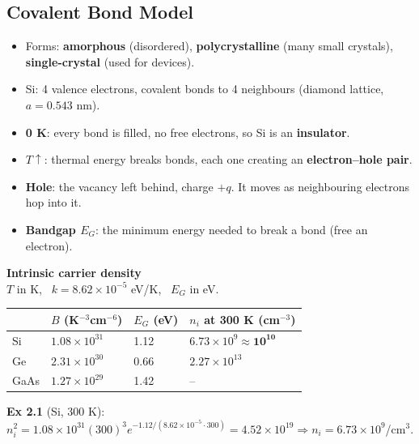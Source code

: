     \subsection[2.2]{Covalent Bond Model}
    \begin{itemize}
        \item Forms: \textbf{amorphous} (disordered), \textbf{polycrystalline} (many small crystals), \textbf{single-crystal} (used for devices).
        \item Si: 4 valence electrons, covalent bonds to 4 neighbours (diamond lattice, $a = 0.543$ nm).
        \item \textbf{0 K}: every bond is filled, no free electrons, so Si is an \textbf{insulator}.
        \item \textbf{$T\uparrow$}: thermal energy breaks bonds, each one creating an \textbf{electron--hole pair}.
        \item \textbf{Hole}: the vacancy left behind, charge $+q$. It moves as neighbouring electrons hop into it.
        \item \textbf{Bandgap $E_G$}: the minimum energy needed to break a bond (free an electron).
    \end{itemize}
    \textbf{Intrinsic carrier density} 
    \\
    $T$ in K, \ $k = 8.62\times10^{-5}$ eV/K, \ $E_G$ in eV.\\
    {\setlength{\tabcolsep}{2.5pt}%
    \begin{tabular}{|l|l|l|l|}
        \hline
        & $B$ (K$^{-3}$cm$^{-6}$) & $E_G$ (eV) & $n_i$ at 300 K (cm$^{-3}$) \\ \hline
        Si & $1.08\times10^{31}$ & 1.12 & $6.73\times10^{9} \approx \mathbf{10^{10}}$ \\ \hline
        Ge & $2.31\times10^{30}$ & 0.66 & $2.27\times10^{13}$ \\ \hline
        GaAs & $1.27\times10^{29}$ & 1.42 & -- \\ \hline
    \end{tabular}\par}\vspace{1pt}
    \textbf{Ex 2.1} (Si, 300 K): $n_i^2 = 1.08\times10^{31}(300)^3 e^{-1.12/(8.62\times10^{-5}\cdot300)} = 4.52\times10^{19} \Rightarrow n_i = 6.73\times10^9$/cm$^3$. 

